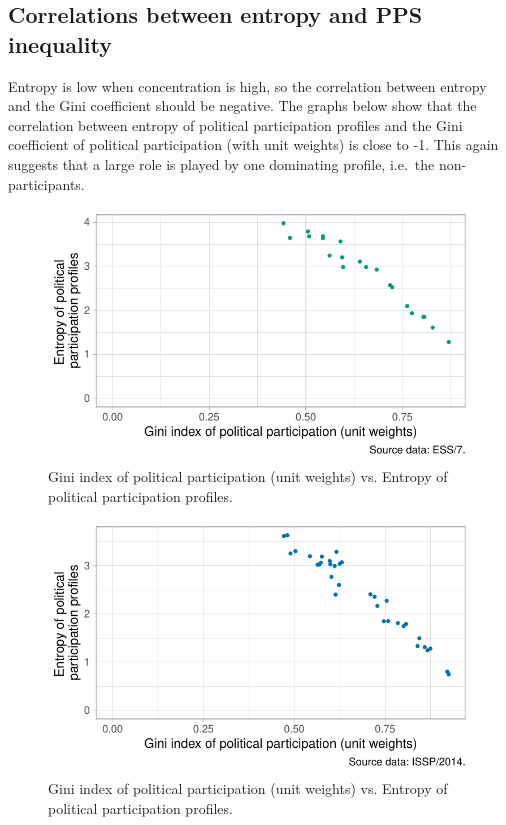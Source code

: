 \documentclass[12pt,]{article}
\begin{document}
\hypertarget{correlations-between-entropy-and-pps-inequality}{%
\subsection{Correlations between entropy and PPS inequality}\label{correlations-between-entropy-and-pps-inequality}}

Entropy is low when concentration is high, so the correlation between entropy and the Gini coefficient should be negative. The graphs below show that the correlation between entropy of political participation profiles and the Gini coefficient of political participation (with unit weights) is close to -1. This again suggests that a large role is played by one dominating profile, i.e.~the non-participants.

\begin{figure}[H]

{\centering \includegraphics{report_files/figure-latex/ess-entropy-1} 

}

\caption{Gini index of political participation (unit weights) vs. Entropy of political participation profiles.}\label{fig:ess-entropy}
\end{figure}

\begin{figure}[H]

{\centering \includegraphics{report_files/figure-latex/issp-entropy-1} 

}

\caption{Gini index of political participation (unit weights) vs. Entropy of political participation profiles.}\label{fig:issp-entropy}
\end{figure}
\end{document}
